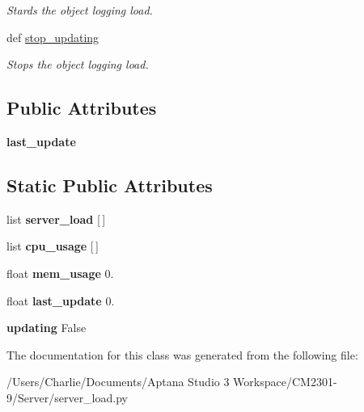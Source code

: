 \begin{DoxyCompactItemize}
\begin{DoxyCompactList}\small\item\em Stards the object logging load. \end{DoxyCompactList}\item 
\hypertarget{classserver__load_1_1_server_load_a2ed75baaef3506087099b41fac09607f}{def \hyperlink{classserver__load_1_1_server_load_a2ed75baaef3506087099b41fac09607f}{stop\-\_\-updating}}\label{classserver__load_1_1_server_load_a2ed75baaef3506087099b41fac09607f}

\begin{DoxyCompactList}\small\item\em Stops the object logging load. \end{DoxyCompactList}\end{DoxyCompactItemize}
\subsection*{Public Attributes}
\begin{DoxyCompactItemize}
\item 
\hypertarget{classserver__load_1_1_server_load_a8103c4ebb72f0aae7f449763b0d0bb42}{{\bfseries last\-\_\-update}}\label{classserver__load_1_1_server_load_a8103c4ebb72f0aae7f449763b0d0bb42}

\end{DoxyCompactItemize}
\subsection*{Static Public Attributes}
\begin{DoxyCompactItemize}
\item 
\hypertarget{classserver__load_1_1_server_load_a93a602d7751152367edeaefad7983f4b}{list {\bfseries server\-\_\-load} \mbox{[}$\,$\mbox{]}}\label{classserver__load_1_1_server_load_a93a602d7751152367edeaefad7983f4b}

\item 
\hypertarget{classserver__load_1_1_server_load_ac1331cbdfbd9ba2f409cc32115942503}{list {\bfseries cpu\-\_\-usage} \mbox{[}$\,$\mbox{]}}\label{classserver__load_1_1_server_load_ac1331cbdfbd9ba2f409cc32115942503}

\item 
\hypertarget{classserver__load_1_1_server_load_a51fc6e20e8b3453951e593dc440b842a}{float {\bfseries mem\-\_\-usage} 0.}\label{classserver__load_1_1_server_load_a51fc6e20e8b3453951e593dc440b842a}

\item 
\hypertarget{classserver__load_1_1_server_load_a98844d6088ecfc744e862a56070567ad}{float {\bfseries last\-\_\-update} 0.}\label{classserver__load_1_1_server_load_a98844d6088ecfc744e862a56070567ad}

\item 
\hypertarget{classserver__load_1_1_server_load_a13b008930cefb3207abfc8e296d84c13}{{\bfseries updating} False}\label{classserver__load_1_1_server_load_a13b008930cefb3207abfc8e296d84c13}

\end{DoxyCompactItemize}


The documentation for this class was generated from the following file\-:\begin{DoxyCompactItemize}
\item 
/\-Users/\-Charlie/\-Documents/\-Aptana Studio 3 Workspace/\-C\-M2301-\/9/\-Server/server\-\_\-load.\-py\end{DoxyCompactItemize}
